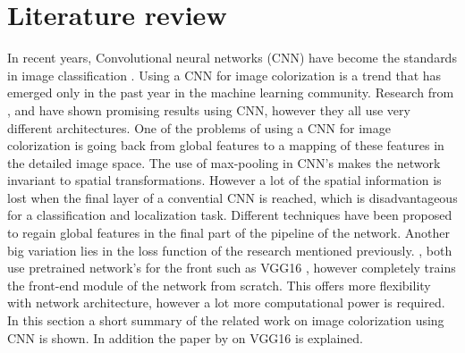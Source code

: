 \section{Literature review}
 
In recent years, Convolutional neural networks (CNN) have become the standards in image
classification \cite{Krizhevsky}. Using a CNN for image colorization is a trend that has emerged only in the past year in the machine learning community. Research from \cite{Dahl}, \cite{Zhang}
and \cite{Cheng} have shown promising results using CNN, however they all use very different
architectures. One of the problems of using a CNN for image colorization is going back from global features to a mapping of these features in the detailed image space. The use of max-pooling in CNN's makes the network invariant to spatial transformations. However a lot of the spatial information is lost when the final layer of a convential CNN is reached, which is disadvantageous for a classification and localization task. Different techniques have been proposed to regain global features in the final part of the pipeline of the network. Another big variation lies in
the loss function of the research mentioned previously. \cite{Dahl}, \cite{Zhang} both use pretrained network's for the front such as VGG16 \cite{Simonyan}, however \cite{cheng}
completely trains the front-end module of the network from scratch. This offers more flexibility with network architecture, however a lot more computational power is required. In
this section a short summary of the related work on image colorization using CNN is shown. In addition the paper by \cite{Simonyan} on VGG16 is explained.

